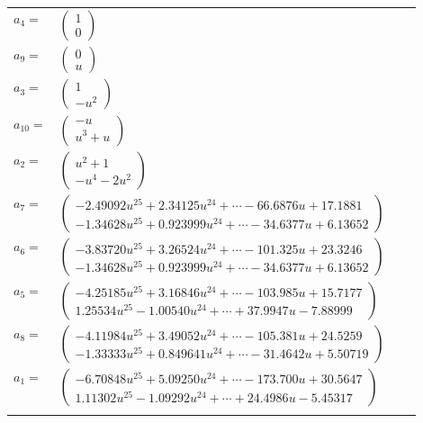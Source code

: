 \documentclass[1p]{elsarticle_modified}
\theoremstyle{definition}
\begin{document}
\begin{tabular}{m{7pt} m{180pt} m{7pt} m{180pt} }
\flushright $a_{4}=$&$\begin{pmatrix}1\\0\end{pmatrix}$ \\
\flushright $a_{9}=$&$\begin{pmatrix}0\\u\end{pmatrix}$ \\
\flushright $a_{3}=$&$\begin{pmatrix}1\\- u^2\end{pmatrix}$ \\
\flushright $a_{10}=$&$\begin{pmatrix}- u\\u^3+u\end{pmatrix}$ \\
\flushright $a_{2}=$&$\begin{pmatrix}u^2+1\\- u^4-2 u^2\end{pmatrix}$ \\
\flushright $a_{7}=$&$\begin{pmatrix}-2.49092 u^{25}+2.34125 u^{24}+\cdots-66.6876 u+17.1881\\-1.34628 u^{25}+0.923999 u^{24}+\cdots-34.6377 u+6.13652\end{pmatrix}$ \\
\flushright $a_{6}=$&$\begin{pmatrix}-3.83720 u^{25}+3.26524 u^{24}+\cdots-101.325 u+23.3246\\-1.34628 u^{25}+0.923999 u^{24}+\cdots-34.6377 u+6.13652\end{pmatrix}$ \\
\flushright $a_{5}=$&$\begin{pmatrix}-4.25185 u^{25}+3.16846 u^{24}+\cdots-103.985 u+15.7177\\1.25534 u^{25}-1.00540 u^{24}+\cdots+37.9947 u-7.88999\end{pmatrix}$ \\
\flushright $a_{8}=$&$\begin{pmatrix}-4.11984 u^{25}+3.49052 u^{24}+\cdots-105.381 u+24.5259\\-1.33333 u^{25}+0.849641 u^{24}+\cdots-31.4642 u+5.50719\end{pmatrix}$ \\
\flushright $a_{1}=$&$\begin{pmatrix}-6.70848 u^{25}+5.09250 u^{24}+\cdots-173.700 u+30.5647\\1.11302 u^{25}-1.09292 u^{24}+\cdots+24.4986 u-5.45317\end{pmatrix}$\\&\end{tabular}
\end{document}
